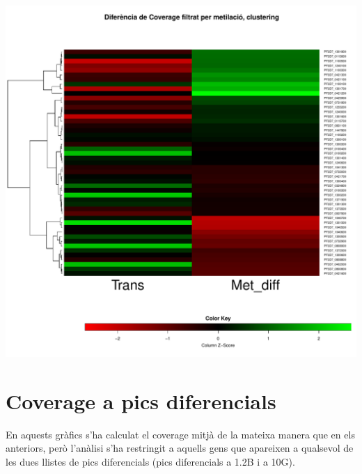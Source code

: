 \documentclass{article}\usepackage[]{graphicx}\usepackage[]{color}
\newenvironment{knitrout}{}{} %
\begin{document}
\begin{knitrout}
\color{fgcolor}

{\centering \includegraphics[width=.9\linewidth]{figure/minimal-heat_cov_met_filter_cluster-1} 

}



\end{knitrout}

\clearpage
\section{Coverage a pics diferencials}
En aquests gràfics s'ha calculat el coverage mitjà de la mateixa manera que en els anteriors, però l'anàlisi s'ha restringit a aquells gens que apareixen a qualsevol de les dues llistes de pics diferencials (pics diferencials a 1.2B i a 10G). 
\end{document}
